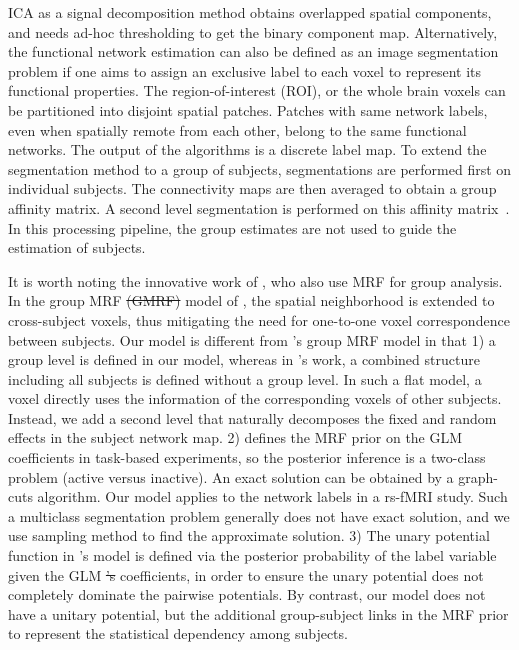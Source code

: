 \documentclass[review,authoryear]{elsarticle}
\providecommand{\DIFdel}[1]{{\protect\color{red}\sout{#1}}}                      %
\providecommand{\DIFdelbegin}{} %
\providecommand{\DIFdelend}{} %
\begin{document}
ICA as a signal decomposition method obtains overlapped spatial components, and
needs ad-hoc thresholding to get the binary component map. Alternatively, the
functional network estimation can also be defined as an image segmentation
problem if one aims to assign an exclusive label to each voxel to represent its
functional properties. The region-of-interest (ROI), or the whole brain voxels
can be partitioned into disjoint spatial patches. Patches with same network
labels, even when spatially remote from each other, belong to the same
functional networks. The output of the algorithms is a discrete label map. To
extend the segmentation method to a group of subjects, segmentations are
performed first on individual subjects. The connectivity maps are then averaged
to obtain a group affinity matrix. A second level segmentation is performed on
this affinity matrix~\citep{bellec2010multi, van2008normalized}. In this
processing pipeline, the group estimates are not used to guide the estimation of
subjects.

It is worth noting the innovative work of \citet{ng2012modeling}, who also use
MRF for group analysis. In the group MRF  \DIFdelbegin \DIFdel{(GMRF) }\DIFdelend model of
\citeauthor{ng2012modeling}, the spatial neighborhood is extended to
cross-subject voxels, thus mitigating the need for one-to-one voxel
correspondence between subjects. Our model is different from
\citeauthor{ng2012modeling}'s group MRF model in that 1) a group level is
defined in our model, whereas in \citeauthor{ng2012modeling}'s work, a combined
structure including all subjects is defined without a group level. In such a
flat model, a voxel directly uses the information of the corresponding voxels of
other subjects. Instead, we add a second level that naturally decomposes the
fixed and random effects in the subject network map. 2)
\citeauthor{ng2012modeling} defines the MRF prior on the GLM coefficients in
task-based experiments, so the posterior inference is a two-class problem
(active versus inactive). An exact solution can be obtained by a graph-cuts
algorithm. Our model applies to the network labels in a rs-fMRI study. Such a
multiclass segmentation problem generally does not have exact solution, and we
use sampling method to find the approximate solution. 3) The unary potential
function in \citeauthor{ng2012modeling}'s model is defined via the posterior
probability of the label variable given the GLM \DIFdelbegin \DIFdel{'s }\DIFdelend coefficients, in order to
ensure the unary potential does not completely dominate the pairwise
potentials. By contrast, our model does not have a unitary potential, but the
additional group-subject links in the MRF prior to represent the statistical
dependency among subjects.
\end{document}
